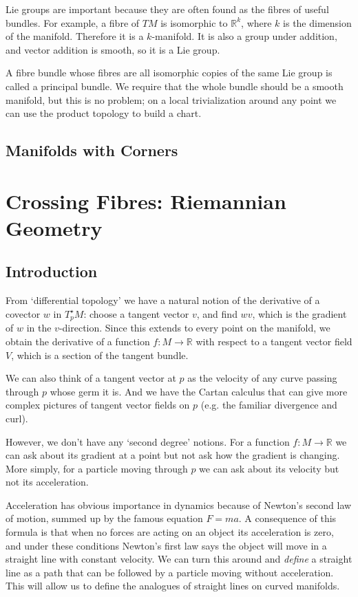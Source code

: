 \documentclass[oneside,english]{amsbook}
\numberwithin{section}{chapter}
\theoremstyle{plain}
\theoremstyle{definition}
\begin{document}
Lie groups are important because they are often found as the fibres of useful bundles. For example, a fibre of $TM$ is isomorphic to $\mathbb{R}^k$, where $k$ is the dimension of the manifold. Therefore it is a $k$-manifold. It is also a group under addition, and vector addition is smooth, so it is a Lie group.

A fibre bundle whose fibres are all isomorphic copies of the same Lie group is called a principal bundle. We require that the whole bundle should be a smooth manifold, but this is no problem; on a local trivialization around any point we can use the product topology to build a chart.


\section{Manifolds with Corners}






\chapter{Crossing Fibres: Riemannian Geometry}

\section*{Introduction}

From `differential topology' we have a natural notion of the derivative of a covector $w$ in $T_p^\star M$: choose a tangent vector $v$, and find $wv$, which is the gradient of $w$ in the $v$-direction. Since this extends to every point on the manifold, we obtain the derivative of a function $f:M\to\mathbb{R}$ with respect to a tangent vector field $V$, which is a section of the tangent bundle.

We can also think of a tangent vector at $p$ as the velocity of any curve passing through $p$ whose germ it is. And we have the Cartan calculus that can give more complex pictures of tangent vector fields on $p$ (e.g. the familiar divergence and curl).

However, we don't have any `second degree' notions. For a function $f:M\to\mathbb{R}$ we can ask about its gradient at a point but not ask how the gradient is changing. More simply, for a particle moving through $p$ we can ask about its velocity but not its acceleration. 

Acceleration has obvious importance in dynamics because of Newton's second law of motion, summed up by the famous equation $F=ma$. A consequence of this formula is that when no forces are acting on an object its acceleration is zero, and under these conditions Newton's first law says the object will move in a straight line with constant velocity. We can turn this around and \emph{define} a straight line as a path that can be followed by a particle moving without acceleration. This will allow us to define the analogues of straight lines on curved manifolds.
\end{document}
